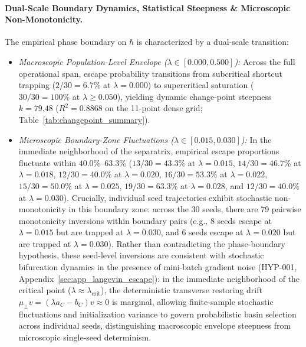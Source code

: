 \documentclass{article}
\theoremstyle{plain}
\theoremstyle{definition}
\begin{document}
\paragraph{Dual-Scale Boundary Dynamics, Statistical Steepness \& Microscopic Non-Monotonicity.}
The empirical phase boundary on $\hbar$ is characterized by a dual-scale transition:
\begin{itemize}[leftmargin=*,noitemsep]
    \item \emph{Macroscopic Population-Level Envelope ($\lambda \in [0.000, 0.500]$):} Across the full operational span, escape probability transitions from subcritical shortcut trapping ($2/30 = 6.7\%$ at $\lambda=0.000$) to supercritical saturation ($30/30 = 100\%$ at $\lambda \ge 0.050$), yielding dynamic change-point steepness $k = 79.48$ ($R^2 = 0.8868$ on the 11-point dense grid; Table~\ref{tab:changepoint_summary}).
    \item \emph{Microscopic Boundary-Zone Fluctuations ($\lambda \in [0.015, 0.030]$):} In the immediate neighborhood of the separatrix, empirical escape proportions fluctuate within $40.0\%$--$63.3\%$ ($13/30 = 43.3\%$ at $\lambda=0.015$, $14/30 = 46.7\%$ at $\lambda=0.018$, $12/30 = 40.0\%$ at $\lambda=0.020$, $16/30 = 53.3\%$ at $\lambda=0.022$, $15/30 = 50.0\%$ at $\lambda=0.025$, $19/30 = 63.3\%$ at $\lambda=0.028$, and $12/30 = 40.0\%$ at $\lambda=0.030$). Crucially, individual seed trajectories exhibit stochastic non-monotonicity in this boundary zone: across the 30 seeds, there are 79 pairwise monotonicity inversions within boundary pairs (e.g., 8 seeds escape at $\lambda=0.015$ but are trapped at $\lambda=0.030$, and 6 seeds escape at $\lambda=0.020$ but are trapped at $\lambda=0.030$). Rather than contradicting the phase-boundary hypothesis, these seed-level inversions are consistent with stochastic bifurcation dynamics in the presence of mini-batch gradient noise (HYP-001, Appendix~\ref{sec:app_langevin_escape}): in the immediate neighborhood of the critical point ($\lambda \approx \lambda_{\text{crit}}$), the deterministic transverse restoring drift $\mu_\perp v = (\lambda a_C - b_C)v \approx 0$ is marginal, allowing finite-sample stochastic fluctuations and initialization variance to govern probabilistic basin selection across individual seeds, distinguishing macroscopic envelope steepness from microscopic single-seed determinism.
\end{itemize}
\end{document}

